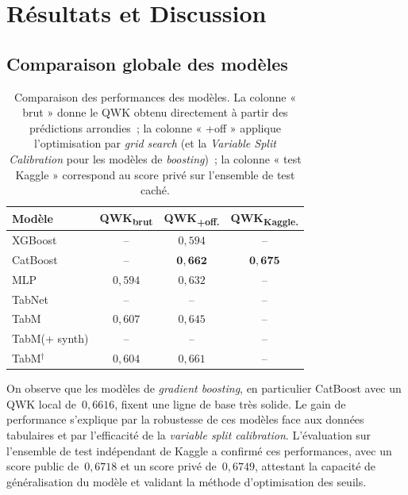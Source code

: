 \documentclass[conference]{IEEEtran}
\begin{document}
\section{Résultats et Discussion}
\label{sec:resultats}

\subsection{Comparaison globale des modèles}

\begin{table}[htbp]
\caption{Comparaison des performances des modèles. La colonne « brut » donne le
QWK obtenu directement à partir des prédictions arrondies~; la colonne « +off » applique l'optimisation par
\textit{grid search} (et la \textit{Variable Split Calibration} pour les
modèles de \textit{boosting})~; la colonne « test Kaggle » correspond au score
privé sur l'ensemble de test caché.}
\label{tab:resultats_globaux}
\centering
\begin{tabular}{lccc}
\toprule
\textbf{Modèle} & \textbf{QWK\textsubscript{brut}} & \textbf{QWK\textsubscript{+off.}} & \textbf{QWK\textsubscript{Kaggle.}}\\
\midrule
XGBoost                  & --                  & $0{,}594$          & -- \\
CatBoost                 & --                  & $\mathbf{0{,}662}$ & $\mathbf{0{,}675}$ \\
MLP                      & $0{,}594$           & $0{,}632$          & -- \\
TabNet                   & --                  & --                 & -- \\
TabM                     & $0{,}607$           & $0{,}645$          & -- \\
TabM(+ synth)            & --                  & --                 & -- \\
TabM$^{\dagger}$         & $0{,}604$           & $0{,}661$          & -- \\
\bottomrule
\end{tabular}
\end{table}

On observe que les modèles de \textit{gradient boosting}, en particulier CatBoost avec un QWK local de~$0{,}6616$, fixent une ligne de base très solide. Le gain de performance s'explique par la robustesse de ces modèles face aux données tabulaires et par l'efficacité de la \textit{variable split calibration}. L'évaluation sur l'ensemble de test indépendant de Kaggle a confirmé ces performances, avec un score public de~$0{,}6718$ et un score privé de~$0{,}6749$, attestant la capacité de généralisation du modèle et validant la méthode d'optimisation des seuils.
\end{document}
